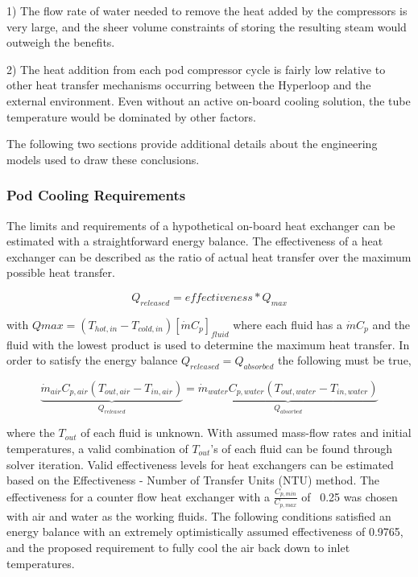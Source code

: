 \documentclass[heading.tex]{subfiles}
\begin{document}
1) The flow rate of water needed to remove the heat added by the compressors is very large, and the sheer volume constraints of storing
the resulting steam would outweigh the benefits.

2) The heat addition from each pod compressor cycle is fairly low relative to other heat transfer mechanisms occurring between the Hyperloop
and the external environment. Even without an active on-board cooling solution, the tube temperature would be dominated by other factors.

The following two sections provide additional details about the engineering models used to draw these conclusions.

\subsubsection{Pod Cooling Requirements}

The limits and requirements of a hypothetical on-board heat exchanger can be estimated with a straightforward energy balance. The
effectiveness of a heat exchanger can be described as the ratio of actual heat transfer over the maximum possible heat transfer.

\begin{equation}
{Q}_{released}  = effectiveness * {Q}_{max}
\end{equation}


with $Qmax=\left(T_{hot,in} - T_{cold,in}\right) [ \dot{m} C_{p} ]_{fluid}$ where each fluid has a $\dot{m} C_{p}$ and the fluid with the lowest
product is used to determine the maximum heat transfer. In order to satisfy the energy balance $Q_{released}=Q_{absorbed}$ the following must be true,

\begin{equation}
\underbrace{\dot{m}_{air} C_{p, air} (T_{out, air} - T_{in, air})}_{{Q}_{released}}  = \underbrace{\dot{m}_{water} C_{p,water} (T_{out, water} - T_{in, water})}_{{Q}_{absorbed}}
\end{equation}

where the $T_{out}$  of each fluid is unknown. With assumed mass-flow rates and initial temperatures, a valid combination of $T_{out}$'s of
each fluid can be found through solver iteration. Valid effectiveness levels for heat exchangers can be estimated based on the
Effectiveness - Number of Transfer Units (NTU) method. 
The effectiveness for a counter flow heat exchanger with a $\frac{C_{p,min}}{C_{p,max}}$ of ~0.25 was chosen with air and water as the working fluids. 
The following conditions satisfied an energy balance with an extremely optimistically assumed effectiveness of 0.9765,
and the proposed requirement to fully cool the air back down to inlet temperatures.
\end{document}
